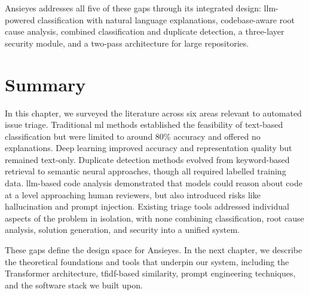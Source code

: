 Ansieyes addresses all five of these gaps through its integrated design: \gls{llm}-powered classification with natural language explanations, codebase-aware root cause analysis, combined classification and duplicate detection, a three-layer security module, and a two-pass architecture for large repositories.

\section{\textbf{Summary}}

In this chapter, we surveyed the literature across six areas relevant to automated issue triage. Traditional \gls{ml} methods established the feasibility of text-based classification but were limited to around 80\% accuracy and offered no explanations. Deep learning improved accuracy and representation quality but remained text-only. Duplicate detection methods evolved from keyword-based retrieval to semantic neural approaches, though all required labelled training data. \gls{llm}-based code analysis demonstrated that models could reason about code at a level approaching human reviewers, but also introduced risks like hallucination and prompt injection. Existing triage tools addressed individual aspects of the problem in isolation, with none combining classification, root cause analysis, solution generation, and security into a unified system.

These gaps define the design space for Ansieyes. In the next chapter, we describe the theoretical foundations and tools that underpin our system, including the Transformer architecture, \gls{tfidf}-based similarity, prompt engineering techniques, and the software stack we built upon.
